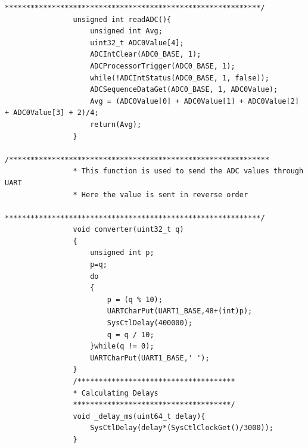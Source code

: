 \documentclass[a4paper,10pt,oneside]{article}
\begin{document}
\begin{lstlisting}[style=CStyle]
				************************************************************/
				unsigned int readADC(){
					unsigned int Avg;
					uint32_t ADC0Value[4];
					ADCIntClear(ADC0_BASE, 1);
					ADCProcessorTrigger(ADC0_BASE, 1);
					while(!ADCIntStatus(ADC0_BASE, 1, false));
					ADCSequenceDataGet(ADC0_BASE, 1, ADC0Value);
					Avg = (ADC0Value[0] + ADC0Value[1] + ADC0Value[2] + ADC0Value[3] + 2)/4;
					return(Avg);
				}
				/*************************************************************
				* This function is used to send the ADC values through UART
				* Here the value is sent in reverse order
				************************************************************/
				void converter(uint32_t q)
				{
					unsigned int p;
					p=q;
					do
					{
						p = (q % 10);
						UARTCharPut(UART1_BASE,48+(int)p);
						SysCtlDelay(400000);
						q = q / 10;
					}while(q != 0);
					UARTCharPut(UART1_BASE,' ');
				}
				/*************************************
				* Calculating Delays
				*************************************/
				void _delay_ms(uint64_t delay){
					SysCtlDelay(delay*(SysCtlClockGet()/3000));
				}
			\end{lstlisting}
			
\end{document}
